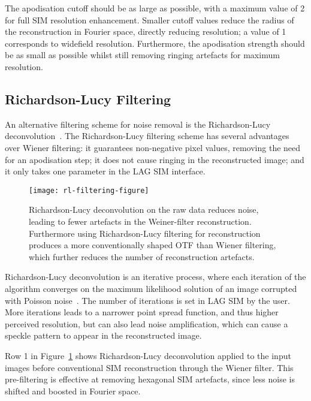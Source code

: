 The apodisation cutoff should be as large as possible, with a maximum value of 2 for full SIM resolution enhancement. 
Smaller cutoff values reduce the radius of the reconstruction in Fourier space, directly reducing resolution; a value of 1 corresponds to widefield resolution. 
Furthermore, the apodisation strength should be as small as possible whilst still removing ringing artefacts for maximum resolution. 

\subsection{Richardson-Lucy Filtering}
An alternative filtering scheme for noise removal is the Richardson-Lucy deconvolution~\cite{perez2016optimal}. 
The Richardson-Lucy filtering scheme has several advantages over Wiener filtering: it guarantees non-negative pixel values, removing the need for an apodisation step; it does not cause ringing in the reconstructed image; and it only takes one parameter in the LAG SIM interface.


\begin{figure}[p]
\centering
\texttt{[image: rl-filtering-figure]}
\caption[LAG SIM: Richardson-Lucy filtering can further reduce SIM reconstruction artefacts]{Richardson-Lucy deconvolution on the raw data reduces noise, leading to fewer artefacts in the Weiner-filter reconstruction. Furthermore using Richardson-Lucy filtering for reconstruction produces a more conventionally shaped OTF than Wiener filtering, which further reduces the number of reconstruction artefacts.}
\label{fig:rl-filtering}
\end{figure}

Richardson-Lucy deconvolution is an iterative process, where each iteration of the algorithm converges on the maximum likelihood solution of an image corrupted with Poisson noise~\cite{richardson1972bayesian, lucy1974iterative}. 
The number of iterations is set in LAG SIM by the user.
More iterations leads to a narrower point spread function, and thus higher perceived resolution, but can also lead noise amplification, which can cause a speckle pattern to appear in the reconstructed image.  

Row 1 in Figure~\ref{fig:rl-filtering} shows Richardson-Lucy deconvolution applied to the input images before conventional SIM reconstruction through the Wiener filter. 
This pre-filtering is effective at removing hexagonal SIM artefacts, since less noise is shifted and boosted in Fourier space.

